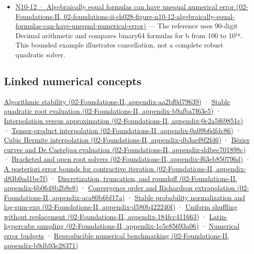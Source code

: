 \begin{itemize}
\item
  \href{../02-Foundations-II/main.pdf\#nameddest=02-foundations-ii-ch028-figure-n10-12-algebraically-equal-formulas-can-have-unequal-numerical-error}{N10-12 · Algebraically equal formulas can have unequal numerical error (02-Foundations-II, 02-foundations-ii-ch028-figure-n10-12-algebraically-equal-formulas-can-have-unequal-numerical-error)} --- The reference uses 90-digit Decimal arithmetic and compares binary64 formulas for b from 100 to 10¹⁶. This bounded example illustrates cancellation, not a complete robust quadratic solver.
\end{itemize}

\subsection{Linked numerical concepts}\label{appendix-cb5af353ef77-linked-numerical-concepts}

\href{../02-Foundations-II/main.pdf\#nameddest=appendix-aa2bf0d79639}{Algorithmic stability (02-Foundations-II, appendix-aa2bf0d79639)} · \href{../02-Foundations-II/main.pdf\#nameddest=appendix-b9afba7f63e5}{Stable quadratic root evaluation (02-Foundations-II, appendix-b9afba7f63e5)} · \href{../02-Foundations-II/main.pdf\#nameddest=appendix-0c2a5f69851e}{Interpolation versus approximation (02-Foundations-II, appendix-0c2a5f69851e)} · \href{../02-Foundations-II/main.pdf\#nameddest=appendix-0a09b6dfdc86}{Tensor-product interpolation (02-Foundations-II, appendix-0a09b6dfdc86)} · \href{../02-Foundations-II/main.pdf\#nameddest=appendix-db3aef8f2fd6}{Cubic Hermite interpolation (02-Foundations-II, appendix-db3aef8f2fd6)} · \href{../02-Foundations-II/main.pdf\#nameddest=appendix-ddbec701898c}{Bézier curves and De Casteljau evaluation (02-Foundations-II, appendix-ddbec701898c)} · \href{../02-Foundations-II/main.pdf\#nameddest=appendix-f63eb850796d}{Bracketed and open root solvers (02-Foundations-II, appendix-f63eb850796d)} · \href{../02-Foundations-II/main.pdf\#nameddest=appendix-d83b0ad1be7f}{A posteriori error bounds for contractive iteration (02-Foundations-II, appendix-d83b0ad1be7f)} · \href{../02-Foundations-II/main.pdf\#nameddest=appendix-6b0648b2b8e8}{Discretization, truncation, and roundoff (02-Foundations-II, appendix-6b0648b2b8e8)} · \href{../02-Foundations-II/main.pdf\#nameddest=appendix-aca80b6bf17a}{Convergence order and Richardson extrapolation (02-Foundations-II, appendix-aca80b6bf17a)} · \href{../02-Foundations-II/main.pdf\#nameddest=appendix-d580b422240f}{Stable probability normalization and log-sum-exp (02-Foundations-II, appendix-d580b422240f)} · \href{../02-Foundations-II/main.pdf\#nameddest=appendix-184fcc411663}{Uniform shuffling without replacement (02-Foundations-II, appendix-184fcc411663)} · \href{../02-Foundations-II/main.pdf\#nameddest=appendix-1c5e85693a06}{Latin-hypercube sampling (02-Foundations-II, appendix-1c5e85693a06)} · \hyperref[appendix-31b8c295e05f]{Numerical error budgets} · \href{../02-Foundations-II/main.pdf\#nameddest=appendix-b9db93e28371}{Reproducible numerical benchmarking (02-Foundations-II, appendix-b9db93e28371)}

